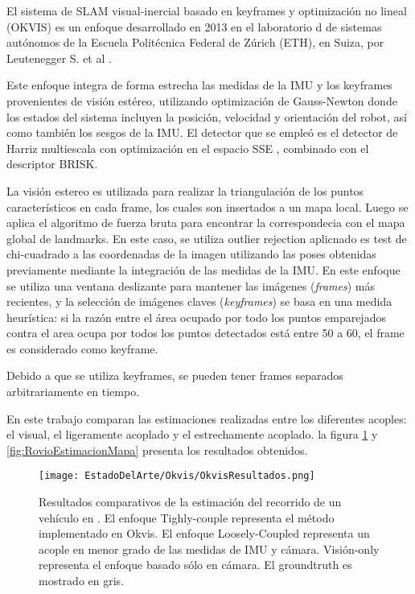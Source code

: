 {El sistema de SLAM visual-inercial basado en keyframes y optimización no lineal (OKVIS)  es un enfoque desarrollado en 2013 en el laboratorio d de sistemas autónomos de la Escuela Politécnica Federal de Zúrich (ETH), en Suiza, por  Leutenegger S. et al \cite{okvis}.


Este enfoque integra de forma estrecha las medidas de la IMU y los keyframes provenientes de visión estéreo, utilizando optimización de Gauss-Newton donde los estados del sistema incluyen la posición, velocidad y orientación del robot, así como también los sesgos de la IMU. El detector que se empleó es el detector de Harriz multiescala con optimización en el espacio SSE , combinado con el descriptor BRISK. 

La visión estereo es utilizada para realizar la triangulación de los puntos característicos en cada frame, los cuales son insertados a un mapa local. Luego se aplica el algoritmo de fuerza bruta para encontrar la correspondecia con el mapa global de landmarks. En este caso, se utiliza outlier rejection aplicnado es test de chi-cuadrado a las coordenadas de la imagen utilizando las poses obtenidas previamente mediante la integración de las medidas de la IMU.
En este enfoque se utiliza una ventana deslizante para mantener las imágenes (\textit{frames}) más recientes, y la selección de imágenes claves (\textit{keyframes}) se basa en una medida heurística: si la razón entre el área ocupado por todo los puntos emparejados contra el area ocupa por todos los puntos detectados está entre 50 a 60, el frame es considerado como keyframe.

Debido a que se utiliza keyframes, se pueden tener frames separados arbitrariamente en tiempo. 

En este trabajo comparan las estimaciones realizadas entre los diferentes acoples: el visual, el ligeramente acoplado y el estrechamente acoplado. la figura \ref{fig:RovioEstimacion} y \ref{fig:RovioEstimacionMapa} presenta los resultados obtenidos.

\begin{figure}[H]
	\centering
	\texttt{[image: EstadoDelArte/Okvis/OkvisResultados.png]}
	\caption[Resultados comparativos de la estimación del recorrido de un vehículo  en \cite{okvis}]{Resultados comparativos de la estimación del recorrido de un vehículo  en \cite{okvis} . El enfoque Tighly-couple representa el método implementado en Okvis. El enfoque Loosely-Coupled representa un acople en menor grado de las medidas de IMU y cámara. Visión-only representa el enfoque basado sólo en cámara. El groundtruth es mostrado en gris.}
	\label{fig:RovioEstimacion}
\end{figure}


}
